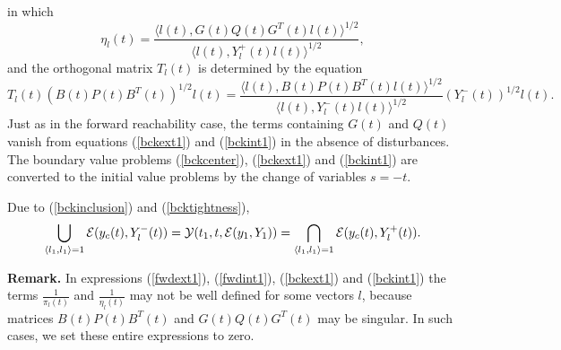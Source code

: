 in which
\[ \eta_l(t) = \frac{\langle l(t),
G(t)Q(t)G^T(t)l(t)\rangle^{1/2}}{\langle l(t),
Y^+_l(t)l(t)\rangle^{1/2}}, \]
and the orthogonal matrix $T_l(t)$ is  determined by the equation
\[ T_l(t)(B(t)P(t)B^T(t))^{1/2}l(t) = \frac{\langle l(t),
B(t)P(t)B^T(t)l(t)\rangle^{1/2}}{\langle l(t),
Y_l^-(t)l(t)\rangle^{1/2}}(Y_l^{-}(t))^{1/2}l(t). \]
Just as in the forward reachability case, the terms containing $G(t)$ and
$Q(t)$ vanish from  equations (\ref{bckext1}) and
(\ref{bckint1}) in the absence of disturbances.
The boundary value problems (\ref{bckcenter}), (\ref{bckext1})
and (\ref{bckint1}) are converted to the initial value
problems by the change of variables $s = -t$.

Due to (\ref{bckinclusion}) and (\ref{bcktightness}),
\[ \bigcup_{\langle l_1,l_1\rangle=1}\EE(y_c(t),Y^-_l(t)) =
\YY(t_1,t,\EE(y_1,Y_1)) =
\bigcap_{\langle l_1,l_1\rangle=1}\EE(y_c(t),Y^+_l(t)). \]

{\bf Remark.} In expressions (\ref{fwdext1}), (\ref{fwdint1}),
(\ref{bckext1}) and (\ref{bckint1}) the terms $\frac{1}{\pi_l(t)}$
and $\frac{1}{\eta_l(t)}$ may not be well defined for some vectors $l$,
because matrices $B(t)P(t)B^T(t)$ and $G(t)Q(t)G^T(t)$ may be singular.
In such cases, we set these entire expressions to  zero.















\newcommand{\OXP}{\overline{X}^+_l}
\newcommand{\OXM}{\overline{X}^-_l}
\newcommand{\UXP}{\underline{X}^+_l}
\newcommand{\UXM}{\underline{X}^-_l}
\newcommand{\OOXP}{\hat{X}^+_l}
\newcommand{\OOXM}{\hat{X}^-_l}
\newcommand{\UUXP}{\breve{X}^+_l}
\newcommand{\UUXM}{\breve{X}^-_l}
\newcommand{\OYP}{\overline{Y}^+_l}
\newcommand{\OYM}{\overline{Y}^-_l}
\newcommand{\UYP}{\underline{Y}^+_l}
\newcommand{\UYM}{\underline{Y}^-_l}









